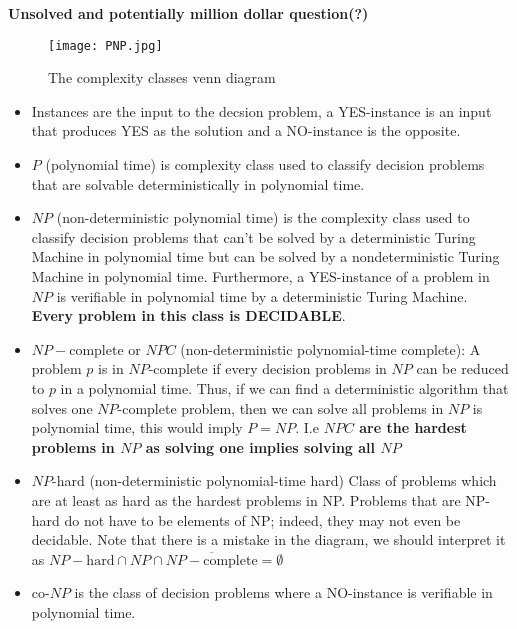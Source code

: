 \documentclass[a4 paper]{article}
\newcommand{\?}{\stackrel{?}{=}}
\begin{document}
\begin{note}{\bcicosaedre}
\textbf{Unsolved and potentially million dollar question(?)} 
\begin{figure}[H]
    \centering
    \texttt{[image: PNP.jpg]}
    \caption{The complexity classes venn diagram \cite[\S 2.3.1; p.35]{de2014edge}\label{PvsNP}}
\end{figure}
\begin{itemize}
    \item Instances are the input to the decsion problem, a YES-instance is an input that produces YES as the solution and a NO-instance is the opposite. 
    \item $ P $ (polynomial time) is complexity class used to classify decision problems that are solvable deterministically in polynomial time. 
    \item $ NP $ (non-deterministic polynomial time) is the complexity class used to classify decision problems that can't be solved by a deterministic Turing Machine in polynomial time but can be solved by a nondeterministic Turing Machine in polynomial time. Furthermore, a YES-instance of a problem in $ NP $ is verifiable in polynomial time by a deterministic Turing Machine. \textbf{Every problem in this class is DECIDABLE}. 
    \item $ NP-\text{complete or } NPC $ (non-deterministic polynomial-time complete): A problem $ p $ is in $ NP $-complete if every decision problems in $ NP $ can be reduced to $ p $ in a polynomial time. Thus, if we can find a deterministic algorithm that solves one $ NP $-complete problem, then we can solve all problems in $ NP $ is polynomial time, this would imply $ P = NP $. I.e \textbf{ $ NPC $ are the hardest problems in $ NP $ as solving one implies solving all $ NP $} 
    \item $ NP $-hard (non-deterministic polynomial-time hard) Class of problems which are at least as hard as the hardest problems in NP. Problems that are NP-hard do not have to be elements of NP; indeed, they may not even be decidable. Note that there is a mistake in the diagram, we should interpret it as $ NP-\text{hard} \cap NP \cap \overline{NP-\text{complete}} = \emptyset $
    \item co-$ NP$ is the class of decision problems where a NO-instance is verifiable in polynomial time. 
\end{itemize}


\end{note}
\end{document}
